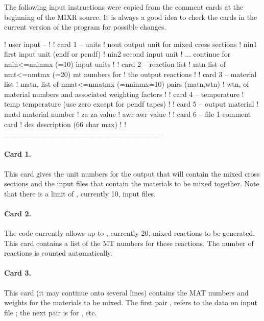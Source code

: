 The following input instructions were copied from the comment cards
at the beginning of the MIXR source.  It is always a good idea to
check the cards in the current version of the program for possible
changes.

\newpage
\small
\begin{ccode}

   !  user input --
   !
   !  card 1  --  units
   !     nout      output unit for mixed cross sections
   !     nin1      first input unit (endf or pendf)
   !     nin2      second input unit
   !      ...      continue for nnin<=nninmx (=10) input units
   !
   !  card 2  --  reaction list
   !      mtn       list of nmt<=nmtmx (=20) mt numbers for
   !                the output reactions
   !
   !  card 3  --  material list
   !     matn,     list of nmat<=nmatmx (=nninmx=10) pairs (matn,wtn)
   !      wtn,     of material numbers and associated weighting factors
   !
   !  card 4  --  temperature
   !     temp      temperature (use zero except for pendf tapes)
   !
   !  card 5  --  output material
   !     matd      material number
   !     za        za value
   !     awr       awr value
   !
   !  card 6  --  file 1 comment card
   !     des      description (66 char max)
   !
   !-------------------------------------------------------------------

\end{ccode}
\normalsize

\paragraph{Card 1.}
This card gives the unit numbers for
the output that will contain the mixed cross sections and the
input files that contain the materials to be mixed together.
Note that there is a limit of , currently 10, input files.

\paragraph{Card 2.}
The code currently allows up to , currently 20,
mixed reactions to be generated.  This card contains a list of
the MT numbers for these reactions.  The number of reactions
is counted automatically.

\paragraph{Card 3.}
This card (it may continue onto several
lines) contains the MAT numbers and weights for the materials to
be mixed.  The first pair ,  refers to the
data on input file ; the next pair is for ,
etc.

